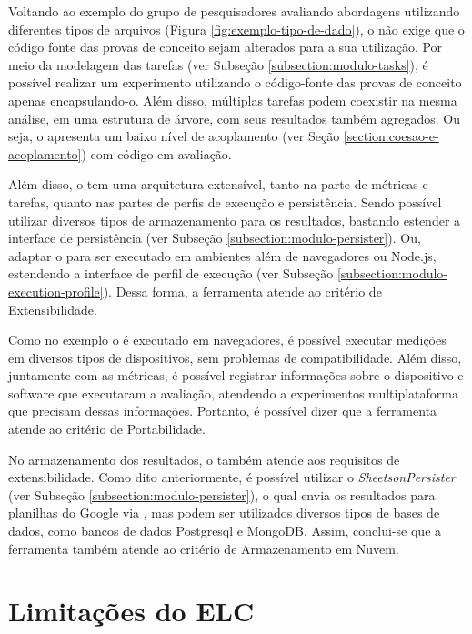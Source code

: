 \documentclass[12pt]{tcc}
\begin{document}
	Voltando ao exemplo do grupo de pesquisadores avaliando abordagens utilizando diferentes tipos de arquivos (Figura \ref{fig:exemplo-tipo-de-dado}), o  não exige que o código fonte das provas de conceito sejam alterados para a sua utilização.
	Por meio da modelagem das tarefas (ver Subseção \ref{subsection:modulo-tasks}), é possível realizar um experimento utilizando o código-fonte das provas de conceito apenas encapsulando-o.
	Além disso, múltiplas tarefas podem coexistir na mesma análise, em uma estrutura de árvore, com seus resultados também agregados.
	Ou seja, o  apresenta um baixo nível de acoplamento (ver Seção \ref{section:coesao-e-acoplamento}) com código em avaliação. 

	Além disso, o  tem uma arquitetura extensível, tanto na parte de métricas e tarefas, quanto nas partes de perfis de execução e persistência.
	Sendo possível utilizar diversos tipos de armazenamento para os resultados, bastando estender a interface de persistência (ver Subseção \ref{subsection:modulo-persister}).
	Ou, adaptar o  para ser executado em ambientes além de navegadores ou Node.js, estendendo a interface de perfil de execução (ver Subseção \ref{subsection:modulo-execution-profile}).
	Dessa forma, a ferramenta atende ao critério de Extensibilidade.

	Como no exemplo o  é executado em navegadores, é possível executar medições em diversos tipos de dispositivos, sem problemas de compatibilidade.
	Além disso, juntamente com as métricas, é possível registrar informações sobre o dispositivo e software que executaram a avaliação, atendendo a experimentos multiplataforma que precisam dessas informações. Portanto, é possível dizer que a ferramenta atende ao critério de Portabilidade.

	No armazenamento dos resultados, o  também atende aos requisitos de extensibilidade.
	Como dito anteriormente, é possível utilizar o \emph{SheetsonPersister} (ver Subseção \ref{subsection:modulo-persister}), o qual envia os resultados para planilhas do Google via , mas podem ser utilizados diversos tipos de bases de dados, como bancos de dados Postgresql e MongoDB.
	Assim, conclui-se que a ferramenta também atende ao critério de Armazenamento em Nuvem.


	\section{Limitações do ELC}
	\label{section:limitacoes-elc}
\end{document}
